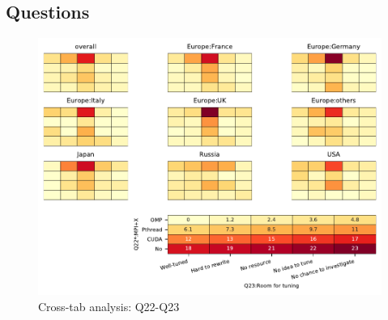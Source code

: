 
\subsection{Questions}


\begin{figure}
\begin{center}
\includegraphics[width=12cm]{../pdfs/Q22-Q23.pdf}
\caption{Cross-tab analysis: Q22-Q23}
\label{fig:Q22-Q23}
\end{center}
\end{figure}
